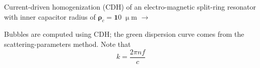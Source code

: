 \documentclass[t]{beamer} \usepackage[english]{babel} \usepackage[utf8]{inputenc} \usetheme{Frankfurt} %
\begin{document}
\begin{frame}[plain]{}%
\begin{columns}[T] %
	\begin{column}{.55\textwidth}
	\vspace{3mm}
	\noindent Current-driven homogenization (CDH) of an electro-magnetic split-ring resonator with inner capacitor radius of $\pmb\rho_c=\pmb 10\;\upmu$m $\rightarrow$
	\vspace{3mm}

	\noindent Bubbles are computed using CDH; the green dispersion curve comes from the scattering-parameters method. Note that $$k = \frac{2\pi n f}{c}$$
	\vspace{5mm}


\end{column}
\end{columns}
\end{frame}
\end{document}
